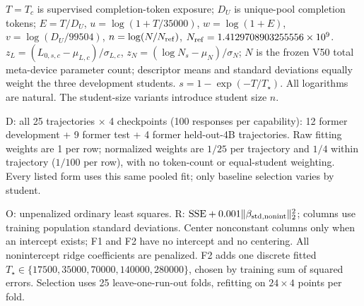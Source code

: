 \begin{minipage}{\textwidth}\scriptsize
$T=T_c$ is supervised completion-token exposure; $D_U$ is unique-pool completion tokens; $E=T/D_U$, $u=\log(1+T/35000)$, $w=\log(1+E)$, $v=\log(D_U/99504)$, $n=\log(N/N_{\rm ref})$, $N_{\rm ref}=1.4129708903255556\times10^9$. $z_L=(L_{0,s,c}-\mu_{L,c})/\sigma_{L,c}$, $z_N=(\log N_s-\mu_N)/\sigma_N$; $N$ is the frozen V50 total meta-device parameter count; descriptor means and standard deviations equally weight the three development students. $s=1-\exp(-T/T_\star)$. All logarithms are natural. The student-size variants introduce student size $n$.
\par D: all 25 trajectories $\times$ 4 checkpoints (100 responses per capability): 12 former development + 9 former test + 4 former \mbox{held-out}-4B trajectories. Raw fitting weights are 1 per row; normalized weights are $1/25$ per trajectory and $1/4$ within trajectory ($1/100$ per row), with no token-count or equal-student weighting. Every listed form uses this same pooled fit; only baseline selection varies by student.
\par O: unpenalized ordinary least squares. R: $\mathrm{SSE}+0.001\|\beta_{\rm std,nonint}\|_2^2$; columns use training population standard deviations. Center nonconstant columns only when an intercept exists; F1 and F2 have no intercept and no centering. All nonintercept ridge coefficients are penalized. F2 adds one discrete fitted $T_\star\in\{17500,35000,70000,140000,280000\}$, chosen by training sum of squared errors. Selection uses 25 leave-one-run-out folds, refitting on $24\times4$ points per fold.
\end{minipage}
\par\smallskip
\endgroup
